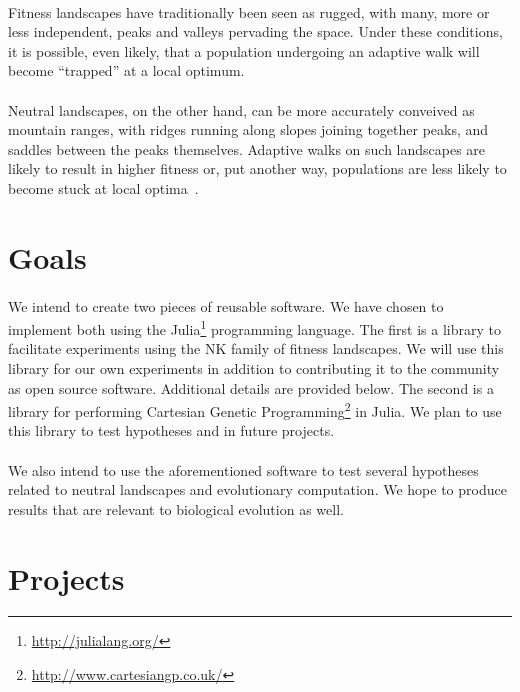 \documentclass[12pt,letterpaper,titlepage,draft]{article}
\begin{document}
\paragraph{}
Fitness landscapes have traditionally been seen as rugged, with many, more or
less independent, peaks and valleys pervading the space. Under these
conditions, it is possible, even likely, that a population undergoing an
adaptive walk will become ``trapped'' at a local optimum.

\paragraph{}
Neutral landscapes, on the other hand, can be more accurately conveived as
mountain ranges, with ridges running along slopes joining together peaks, and
saddles between the peaks themselves. Adaptive walks on such landscapes are
likely to result in higher fitness or, put another way, populations are less
likely to become stuck at local optima~\cite{Newman1998}.

\section{Goals}

\paragraph{}
We intend to create two pieces of reusable software. We have chosen to
implement both using the Julia\footnote{\url{http://julialang.org/}}
programming language. The first is a library to facilitate experiments using
the NK family of fitness landscapes. We will use this library for our own
experiments in addition to contributing it to the community as open source
software. Additional details are provided below. The second is a library for
performing Cartesian Genetic
Programming\footnote{\url{http://www.cartesiangp.co.uk/}} in Julia. We plan to
use this library to test hypotheses and in future projects.

\paragraph{}
We also intend to use the aforementioned software to test several hypotheses
related to neutral landscapes and evolutionary computation. We hope to produce
results that are relevant to biological evolution as well.

\section{Projects}
\end{document}
